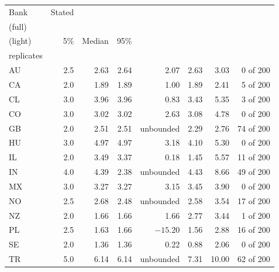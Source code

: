 \begin{tabular}{lrrrrrrr}\toprule
Bank & Stated & \hd{$\hat\tau$\\(full)} & \hd{$\hat\tau$\\(light)} & 5\% & Median & 95\% & \hd{Degenerate\\replicates} \\\midrule
AU & 2.5 & 2.63 & 2.64 & 2.07 & 2.63 & 3.03 & 0 of 200\\
CA & 2.0 & 1.89 & 1.89 & 1.00 & 1.89 & 2.41 & 5 of 200\\
CL & 3.0 & 3.96 & 3.96 & 0.83 & 3.43 & 5.35 & 3 of 200\\
CO & 3.0 & 3.02 & 3.02 & 2.63 & 3.08 & 4.78 & 0 of 200\\
GB & 2.0 & 2.51 & 2.51 & unbounded & 2.29 & 2.76 & 74 of 200\\
HU & 3.0 & 4.97 & 4.97 & 3.18 & 4.10 & 5.30 & 0 of 200\\
IL & 2.0 & 3.49 & 3.37 & 0.18 & 1.45 & 5.57 & 11 of 200\\
IN & 4.0 & 4.39 & 2.38 & unbounded & 4.43 & 8.66 & 49 of 200\\
MX & 3.0 & 3.27 & 3.27 & 3.15 & 3.45 & 3.90 & 0 of 200\\
NO & 2.5 & 2.68 & 2.48 & unbounded & 2.58 & 3.54 & 17 of 200\\
NZ & 2.0 & 1.66 & 1.66 & 1.66 & 2.77 & 3.44 & 1 of 200\\
PL & 2.5 & 1.63 & 1.66 & $-15.20$ & 1.56 & 2.88 & 16 of 200\\
SE & 2.0 & 1.36 & 1.36 & 0.22 & 0.88 & 2.06 & 0 of 200\\
TR & 5.0 & 6.14 & 6.14 & unbounded & 7.31 & 10.00 & 62 of 200\\
\bottomrule\end{tabular}